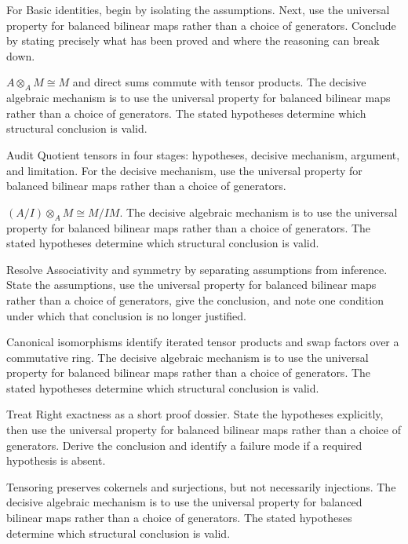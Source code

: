 \begin{problem}\label{prob:v10-problem-04}
For Basic identities, begin by isolating the assumptions. Next, use the universal property for balanced bilinear maps rather than a choice of generators. Conclude by stating precisely what has been proved and where the reasoning can break down.
\end{problem}
\begin{solution}
$A\otimes_A M\cong M$ and direct sums commute with tensor products. The decisive algebraic mechanism is to use the universal property for balanced bilinear maps rather than a choice of generators. The stated hypotheses determine which structural conclusion is valid.
\end{solution}

\begin{problem}\label{prob:v10-problem-05}
Audit Quotient tensors in four stages: hypotheses, decisive mechanism, argument, and limitation. For the decisive mechanism, use the universal property for balanced bilinear maps rather than a choice of generators.
\end{problem}
\begin{solution}
$(A/I)\otimes_A M\cong M/IM$. The decisive algebraic mechanism is to use the universal property for balanced bilinear maps rather than a choice of generators. The stated hypotheses determine which structural conclusion is valid.
\end{solution}

\begin{problem}\label{prob:v10-problem-06}
Resolve Associativity and symmetry by separating assumptions from inference. State the assumptions, use the universal property for balanced bilinear maps rather than a choice of generators, give the conclusion, and note one condition under which that conclusion is no longer justified.
\end{problem}
\begin{solution}
Canonical isomorphisms identify iterated tensor products and swap factors over a commutative ring. The decisive algebraic mechanism is to use the universal property for balanced bilinear maps rather than a choice of generators. The stated hypotheses determine which structural conclusion is valid.
\end{solution}

\begin{problem}\label{prob:v10-problem-07}
Treat Right exactness as a short proof dossier. State the hypotheses explicitly, then use the universal property for balanced bilinear maps rather than a choice of generators. Derive the conclusion and identify a failure mode if a required hypothesis is absent.
\end{problem}
\begin{solution}
Tensoring preserves cokernels and surjections, but not necessarily injections. The decisive algebraic mechanism is to use the universal property for balanced bilinear maps rather than a choice of generators. The stated hypotheses determine which structural conclusion is valid.
\end{solution}

